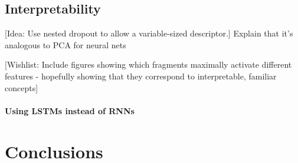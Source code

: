 \documentclass{article}
\begin{document}
\subsection{Interpretability}
[Idea: Use nested dropout to allow a variable-sized descriptor.]
Explain that it's analogous to PCA for neural nets

[Wishlist: Include figures showing which fragments maximally activate different features - hopefully showing that they correspond to interpretable, familiar concepts]

\paragraph{Using LSTMs instead of RNNs}


\section{Conclusions}







\end{document}
